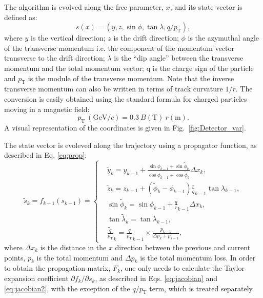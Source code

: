 The algorithm is evolved along the free parameter, $x$, and its state vector is defined as:
\begin{equation}\label{eq:state}
    s(x) = \left(y,z,\sin{\phi},\tan{\lambda}, q/p_{\text{T}}\right),
\end{equation}
where $y$ is the vertical direction; $z$ is the drift direction; $\phi$ is the azymuthal angle of the transverse momentum i.e. the component of the momentum vector transverse to the drift direction; $\lambda$ is the ``dip angle''  between the transverse momentum and the total momentum vector; q is the charge sign of the particle and $p_{\text{T}}$ is the module of the transverse momentum. Note that the inverse transverse momentum can also be written in terms of track curvature $1/r$. The conversion is easily obtained using the standard formula for charged particles moving in a magnetic field:
\begin{equation}\label{eq:curvatureconv}
    p_{\text{T}} \ \left(\text{GeV}/c\right) =0.3 \ B \left(\text{T}\right) \ r \left(\text{m}\right).
\end{equation}
A visual representation of the coordinates is given in Fig.~\ref{fig:Detector_var}.

The state vector is evoleved along the trajectory using a propagator function, as described in Eq. \ref{eq:prop}:
\begin{equation} \label{eq:func}
    \widetilde{s}_k = f_{k-1}(s_{k-1}) =
        \left\{
        	\begin{aligned}
        		& \widetilde{y}_k  =  y_{k-1}+ \frac{\sin{\phi}_{k-1}+\sin\widetilde{\phi}_k} 
                                     {\cos{\phi}_{k-1}+\cos\widetilde{\phi}_k}  \Delta x_k,  \\
        		& \widetilde{z}_k  =  z_{k-1}+\left(\widetilde{\phi}_k-\phi_{k-1}\right)\frac{r}{q}_{k-1}\tan{\lambda}_{k-1} ,\\ 
                    & \sin \widetilde{\phi}_k =  \sin \phi_{k-1} + \frac{q}{r}_{k-1}\Delta x_k,  \\               
                    & \tan \widetilde{\lambda}_k   =  \tan \lambda_{k-1}, \\   
                    & \widetilde{\frac{q}{p_{\text{T}}}}_k = \frac{q}{p_{\text{T}}}_{k-1} \times\frac{p_{k-1}}{\Delta p_k+p_{k-1}},
        	\end{aligned}
        \right.
\end{equation}
where $\Delta x_k$ is the distance in the $x$ direction between the previous and current points, $p_k$ is the total momentum and $\Delta p_k$ is the total momentum loss. In order to obtain the propagation matrix, $F_k$, one only needs to calculate the Taylor expansion coefficient $\partial f_k / \partial s_k$, as described in Eqs. \ref{eq:jacobian} and \ref{eq:jacobian2}, with the exception of the $q/p_{\text{T}}$ term, which is treated separately.

